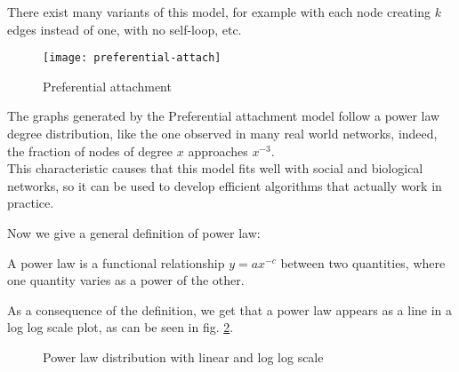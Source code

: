     There exist many variants of this model, for example with each node creating $k$ edges instead of one, with no self-loop, etc.

    \begin{figure}[h!]
        \centering
        \texttt{[image: preferential-attach]}
        \caption{Preferential attachment}
        \label{fig:pref-att}
    \end{figure}

    The graphs generated by the Preferential attachment model follow a power law degree distribution, like the one observed in many real world networks, indeed, the fraction of nodes of degree $x$ approaches $x^{-3}$.\\
    This characteristic causes that this model fits well with social and biological networks, so it can be used to develop efficient algorithms that actually work in practice.
    
    Now we give a general definition of power law:
    \begin{defn}
        A power law is a functional relationship $y = ax^{-c}$ between two quantities, where one quantity varies as a power of the other.
    \end{defn}

    As a consequence of the definition, we get that a power law appears as a line in a log log scale plot, as can be seen in fig. \ref{fig:power-law}.

    \begin{figure}[h!]
        \centering
        \hskip 7pt
        \caption{Power law distribution with linear and log log scale}
        \label{fig:power-law}
    \end{figure}
    